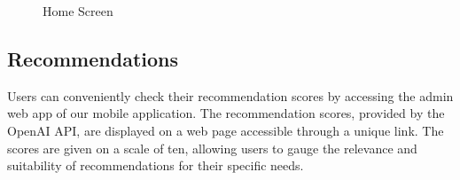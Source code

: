 \begin{figure}[H]
	\centering
	\caption{Home Screen}
	\label{fig:swiping}
\end{figure}
\subsection{Recommendations}\label{subsec:recommendations}
Users can conveniently check their recommendation scores by accessing the admin web app of our mobile application. The recommendation scores, provided by the OpenAI API, are displayed on a web page accessible through a unique link. The scores are given on a scale of ten, allowing users to gauge the relevance and suitability of recommendations for their specific needs.

